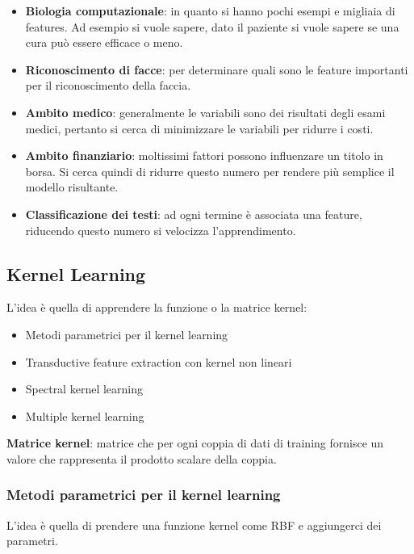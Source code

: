 \begin{itemize}
\item
  \textbf{Biologia computazionale}: in quanto si hanno pochi esempi e
  migliaia di features. Ad esempio si vuole sapere, dato il paziente si
  vuole sapere se una cura può essere efficace o meno.
\item
  \textbf{Riconoscimento di facce}: per determinare quali sono le
  feature importanti per il riconoscimento della faccia.
\item
  \textbf{Ambito medico}: generalmente le variabili sono dei risultati
  degli esami medici, pertanto si cerca di minimizzare le variabili per
  ridurre i costi.
\item
  \textbf{Ambito finanziario}: moltissimi fattori possono influenzare un
  titolo in borsa. Si cerca quindi di ridurre questo numero per rendere
  più semplice il modello risultante.
\item
  \textbf{Classificazione dei testi}: ad ogni termine è associata una
  feature, riducendo questo numero si velocizza l'apprendimento.
\end{itemize}

\subsection{Kernel Learning}\label{kernel-learning}

L'idea è quella di apprendere la funzione o la matrice kernel:

\begin{itemize}
\item
  Metodi parametrici per il kernel learning
\item
  Transductive feature extraction con kernel non lineari
\item
  Spectral kernel learning
\item
  Multiple kernel learning
\end{itemize}

\textbf{Matrice kernel}: matrice che per ogni coppia di dati di training
fornisce un valore che rappresenta il prodotto scalare della coppia.

\subsubsection{Metodi parametrici per il kernel learning}\label{metodi-parametrici-per-il-kernel-learning}

L'idea è quella di prendere una funzione kernel come RBF e aggiungerci
dei parametri.

